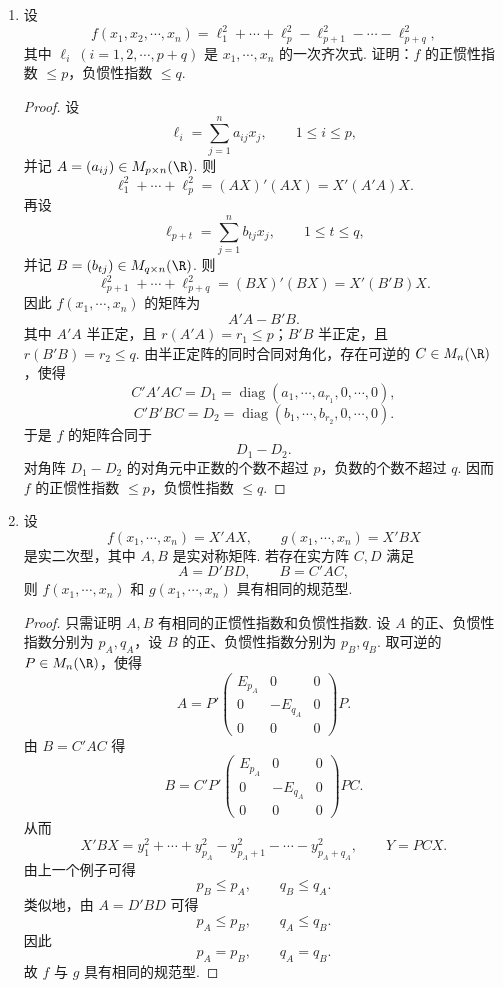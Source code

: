 \begin{example}
\begin{enumerate}
\begin{proof}
\[			\]
			取
			\[
			P=P_1P_2P_3
			\]
			即可.
		\end{proof}
		\item 设
		\[
		f(x_1,x_2,\cdots,x_n)=\ell_1^2+\cdots+\ell_p^2-\ell_{p+1}^2-\cdots-\ell_{p+q}^2,
		\]
		其中 $\ell_i\ (i=1,2,\cdots,p+q)$ 是 $x_1,\cdots,x_n$ 的一次齐次式. 证明：$f$ 的正惯性指数 $\leq p$，负惯性指数 $\leq q$.
		\begin{proof}
			设
			\[
			\ell_i=\sum_{j=1}^n a_{ij}x_j,\qquad 1\leq i\leq p,
			\]
			并记 $A=(a_{ij})\in M_{p\times n}(\R)$. 则
			\[
			\ell_1^2+\cdots+\ell_p^2=(AX)'(AX)=X'(A'A)X.
			\]
			再设
			\[
			\ell_{p+t}=\sum_{j=1}^n b_{tj}x_j,
			\qquad 1\leq t\leq q,
			\]
			并记 $B=(b_{tj})\in M_{q\times n}(\R)$. 则
			\[
			\ell_{p+1}^2+\cdots+\ell_{p+q}^2=(BX)'(BX)=X'(B'B)X.
			\]
			因此 $f(x_1,\cdots,x_n)$ 的矩阵为
			\[
			A'A-B'B.
			\]
			其中 $A'A$ 半正定，且 $r(A'A)=r_1\leq p$；$B'B$ 半正定，且 $r(B'B)=r_2\leq q$.
			由半正定阵的同时合同对角化，存在可逆的 $C\in M_n(\R)$，使得
			\[
			C'A'AC=D_1=\operatorname{diag}(a_1,\cdots,a_{r_1},0,\cdots,0),
			\]
			\[
			C'B'BC=D_2=\operatorname{diag}(b_1,\cdots,b_{r_2},0,\cdots,0).
			\]
			于是 $f$ 的矩阵合同于
			\[
			D_1-D_2.
			\]
			对角阵 $D_1-D_2$ 的对角元中正数的个数不超过 $p$，负数的个数不超过 $q$. 因而 $f$ 的正惯性指数 $\leq p$，负惯性指数 $\leq q$.
		\end{proof}
		\item 设
		\[
		f(x_1,\cdots,x_n)=X'AX,
		\qquad
		g(x_1,\cdots,x_n)=X'BX
		\]
		是实二次型，其中 $A,B$ 是实对称矩阵. 若存在实方阵 $C,D$ 满足
		\[
		A=D'BD,
		\qquad
		B=C'AC,
		\]
		则 $f(x_1,\cdots,x_n)$ 和 $g(x_1,\cdots,x_n)$ 具有相同的规范型.
		\begin{proof}
			只需证明 $A,B$ 有相同的正惯性指数和负惯性指数. 设 $A$ 的正、负惯性指数分别为 $p_A,q_A$，设 $B$ 的正、负惯性指数分别为 $p_B,q_B$.
			取可逆的 $P\in M_n(\R)$，使得
			\[
			A=P'
			\begin{pmatrix}
				E_{p_A}&0&0\\
				0&-E_{q_A}&0\\
				0&0&0
			\end{pmatrix}P.
			\]
			由 $B=C'AC$ 得
			\[
			B=C'P'
			\begin{pmatrix}
				E_{p_A}&0&0\\
				0&-E_{q_A}&0\\
				0&0&0
			\end{pmatrix}PC.
			\]
			从而
			\[
			X'BX=y_1^2+\cdots+y_{p_A}^2-y_{p_A+1}^2-\cdots-y_{p_A+q_A}^2,
			\qquad Y=PCX.
			\]
			由上一个例子可得
			\[
			p_B\leq p_A,
			\qquad
			q_B\leq q_A.
			\]
			类似地，由 $A=D'BD$ 可得
			\[
			p_A\leq p_B,
			\qquad
			q_A\leq q_B.
			\]
			因此
			\[
			p_A=p_B,
			\qquad
			q_A=q_B.
			\]
			故 $f$ 与 $g$ 具有相同的规范型.
		\end{proof}
	\end{enumerate}
	
	
\end{example}
